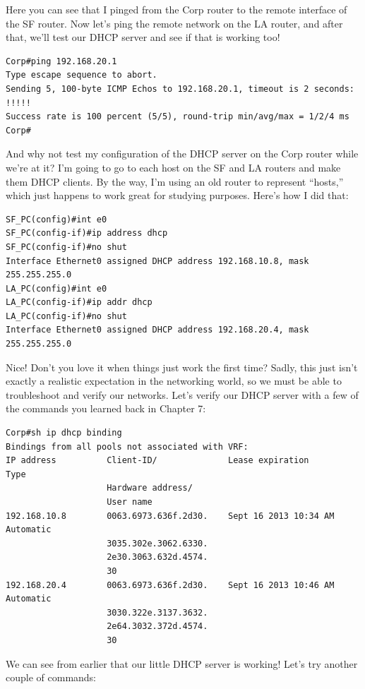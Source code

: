 Here you can see that I pinged from the Corp router to the remote
interface of the SF router. Now let's ping the remote network on the LA
router, and after that, we'll test our DHCP server and see if that is
working too!

\begin{verbatim}
Corp#ping 192.168.20.1
Type escape sequence to abort.
Sending 5, 100-byte ICMP Echos to 192.168.20.1, timeout is 2 seconds:
!!!!!
Success rate is 100 percent (5/5), round-trip min/avg/max = 1/2/4 ms
Corp#
\end{verbatim}

\protect\hypertarget{c09.xhtmlux5cux23Page_389}{}{}And why not test my
configuration of the DHCP server on the Corp router while we're at it?
I'm going to go to each host on the SF and LA routers and make them DHCP
clients. By the way, I'm using an old router to represent ``hosts,''
which just happens to work great for studying purposes. Here's how I did
that:

\begin{verbatim}
SF_PC(config)#int e0
SF_PC(config-if)#ip address dhcp
SF_PC(config-if)#no shut
Interface Ethernet0 assigned DHCP address 192.168.10.8, mask 255.255.255.0
LA_PC(config)#int e0
LA_PC(config-if)#ip addr dhcp
LA_PC(config-if)#no shut
Interface Ethernet0 assigned DHCP address 192.168.20.4, mask 255.255.255.0
\end{verbatim}

Nice! Don't you love it when things just work the first time? Sadly,
this just isn't exactly a realistic expectation in the networking world,
so we must be able to troubleshoot and verify our networks. Let's verify
our DHCP server with a few of the commands you learned back in Chapter
7:

\begin{verbatim}
Corp#sh ip dhcp binding
Bindings from all pools not associated with VRF:
IP address          Client-ID/              Lease expiration        Type
                    Hardware address/
                    User name
192.168.10.8        0063.6973.636f.2d30.    Sept 16 2013 10:34 AM    Automatic
                    3035.302e.3062.6330.
                    2e30.3063.632d.4574.
                    30
192.168.20.4        0063.6973.636f.2d30.    Sept 16 2013 10:46 AM    Automatic
                    3030.322e.3137.3632.
                    2e64.3032.372d.4574.
                    30
\end{verbatim}

We can see from earlier that our little DHCP server is working! Let's
try another couple of commands:

